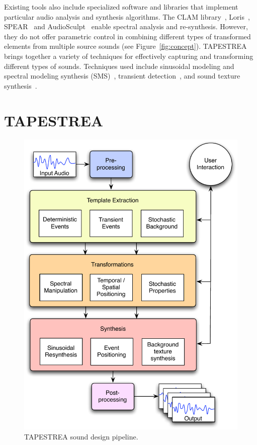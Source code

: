 \documentclass{sig-alt-release2}
\begin{document}
Existing tools also include specialized software and libraries that implement particular audio analysis and synthesis algorithms. The CLAM library~\cite{Amatriain05}, Loris~\cite{Fitz02}, SPEAR~\cite{Klingbeil05} and AudioSculpt~\cite{Bogaards04} enable spectral analysis and re-synthesis. However, they do not offer parametric control in combining different types of transformed elements from multiple source sounds (see Figure~\ref{fig:concept}). TAPESTREA brings together a variety of techniques for effectively capturing and transforming different types of sounds. 
Techniques used include sinusoidal modeling and spectral modeling synthesis (SMS)~\cite{McAulay86,Quatieri86,Serra89}, transient detection~\cite{Verma98,Bello05}, and sound texture synthesis~\cite{Dubnov02,Athineos03,Zhu04,Froejd07}.

\section{TAPESTREA}

\begin{figure}[h]
\centering
\includegraphics[width=.97\columnwidth]{pipeline.pdf} %
\caption{TAPESTREA sound design pipeline.}
\label{fig:pipeline}
\end{figure}
\end{document}
